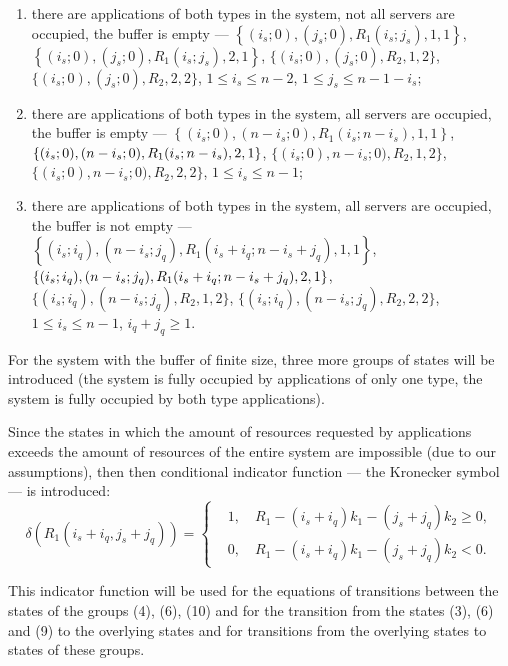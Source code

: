 {\begin{enumerate}
  $\left\{(0; 0),(n; j_q), R_2,1,2\right\}$,
  $\left\{(0; 0),(n; j_n), R_2,2,2\right\}$, $j_q\geqslant  1$;
\item there are applications of both types in the system, not all
  servers are occupied, the buffer is empty ---
  $\left\{(i_s; 0),(j_s; 0), R_1(i_s;j_s),1,1\right\}$,
  $\left\{(i_s; 0),(j_s; 0), R_1(i_s;j_s),2,1\right\}$,
  $\{(i_s; 0),(j_s; 0), R_2,1,2\}$, $\{(i_s; 0),(j_s; 0), R_2,2,2\}$,
  $1\leqslant  i_s \leqslant  n-2$, $1\leqslant  j_s \leqslant  n-1-i_s$;
\item there are applications of both types in the system, all servers
  are occupied, the buffer is empty ---
  $\left\{(i_s; 0),(n-i_s; 0), R_1(i_s;n-i_s),1,1\right\}$,
  $\{(i_s; 0),(n-i_s; 0), \\* R_1(i_s;n-i_s),2,1\}$,
  $\{(i_s; 0),n-i_s; 0), R_2,1,2\}$,
  $\{(i_s; 0),n-i_s; 0), R_2,2,2\}$, $1\leqslant  i_s \leqslant  n-1$;
\item there are applications of both types in the system, all servers
  are occupied, the buffer is not empty ---
  $\left\{(i_s; i_q),(n-i_s; j_q), R_1(i_s+i_q;n-i_s+
    j_q),1,1\right\}$,
  $\{(i_s; i_q), \\* (n-i_s; j_q), R_1(i_s+i_q; n-i_s+ j_q),2,1\}$,
  $\{(i_s; i_q),(n-i_s; j_q ), R_2,1,2\}$,
  $\{(i_s; i_q),(n-i_s; j_q), R_2,2,2\}$, $1\leqslant  i_s \leqslant  n-1$,
  $i_q+j_q\geqslant  1$.
\end{enumerate}

For the system with the buffer of finite size, three more groups of
states will be introduced (the system is fully occupied by
applications of only one type, the system is fully occupied by both
type applications).

Since the states in which the amount of resources requested by
applications exceeds the amount of resources of the entire system are
impossible (due to our assumptions), then then conditional indicator
function --- the Kronecker symbol --- is introduced:
\begin{equation}
  \delta\left(R_1(i_s+i_q,j_s+j_q)\right)=
  \left\{
    \begin{aligned}
      &1,\quad R_1-(i_s+i_q)k_1-(j_s+j_q)k_2\geqslant  0,\\
      &0, \quad R_1-(i_s+i_q)k_1-(j_s+j_q)k_2 < 0.
    \end{aligned}
  \right.
\end{equation}

This indicator function will be used for the equations of transitions
between the states of the groups (4), (6), (10) and for the transition
from the states (3), (6) and (9) to the overlying states and for
transitions from the overlying states to states of these groups.


}
